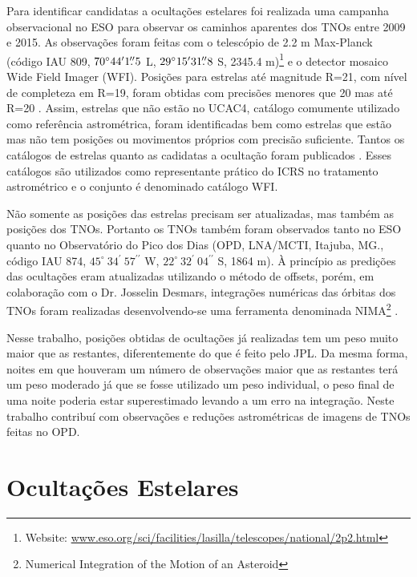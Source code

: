 \documentclass[12pt,a4paper]{monografia}
\newcommand{\degr}{\ensuremath{^{\circ}}}%
\newcommand{\arcmin}{\ensuremath{^{\prime}}}%
\newcommand{\arcsec}{\ensuremath{^{\prime\prime}}}%
\newcommand{\farcs}{\mbox{\ensuremath{.\!\!^{\prime\prime}}}}%
\begin{document}
Para identificar candidatas a ocultações estelares foi realizada uma campanha observacional no ESO para observar os caminhos aparentes dos TNOs entre 2009 e 2015. As observações foram feitas com o telescópio de 2.2 m Max-Planck (código IAU 809, $70\degr44\arcmin1\farcs5$ L, $29\degr15\arcmin31\farcs8$ S, 2345.4 m)\footnote{Website: \url{www.eso.org/sci/facilities/lasilla/telescopes/national/2p2.html}} e o detector mosaico Wide Field Imager (WFI). Posições para estrelas até magnitude R=21, com nível de completeza em R=19, foram obtidas com precisões menores que 20 mas até R=20 \citep{Assafin2012}. Assim, estrelas que não estão no UCAC4, catálogo comumente utilizado como referência astrométrica, foram identificadas bem como estrelas que estão mas não tem posições ou movimentos próprios com precisão suficiente. Tantos os catálogos de estrelas quanto as cadidatas a ocultação foram publicados \citep{Assafin2010, Assafin2012, Camargo2013}. Esses catálogos são utilizados como representante prático do ICRS no tratamento astrométrico e o conjunto é denominado catálogo WFI.

Não somente as posições das estrelas precisam ser atualizadas, mas também as posições dos TNOs. Portanto os TNOs também foram observados tanto no ESO quanto no Observatório do Pico dos Dias (OPD, LNA/MCTI, Itajuba, MG., código IAU 874, $45^{\circ} ~34\arcmin ~57\arcsec$ W, $22^{\circ} ~32\arcmin ~04\arcsec$ S, 1864 m). À princípio as predições das ocultações eram atualizadas utilizando o método de offsets, porém, em colaboração com o Dr. Josselin Desmars, integrações numéricas das órbitas dos TNOs foram realizadas desenvolvendo-se uma ferramenta denominada NIMA\footnote{Numerical Integration of the Motion of an Asteroid} \citep[submetido]{Desmars2015}.

Nesse trabalho, posições obtidas de ocultações já realizadas tem um peso muito maior que as restantes, diferentemente do que é feito pelo JPL. Da mesma forma, noites em que houveram um número de observações maior que as restantes terá um peso moderado já que se fosse utilizado um peso individual, o peso final de uma noite poderia estar superestimado levando a um erro na integração. Neste trabalho contribuí com observações e reduções astrométricas de imagens de TNOs feitas no OPD.

\section{Ocultações Estelares}
\label{Sec: TNO-occ}
\end{document}
